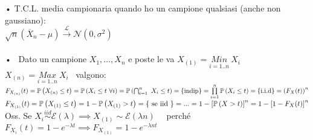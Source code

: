 • T.C.L. media campionaria quando ho un campione qualsiasi (anche non gaussiano):\\
$\sqrt{n}(\overline{X}_n-\mu)\xrightarrow{\mathcal{L}} \mathcal{N}(0,\sigma^2)$ \\ \\







• \ Dato un campione $X_1, ..., X_n$ e poste le va $X_{(1)}=\underset{i=1..n}{Min} \ X_i$ \ \ $X_{(n)}=\underset{i=1..n}{Max} \ X_i$ \ valgono:\\
$F_{X_{(n)}}(t)=\mathbb{P} \left( X_{(n)}\le t \right) = \mathbb{P} \left( X_i \le t \ \forall i \right) = \mathbb{P} \left( \bigcap_{i=1}^n \ X_i\le t \right) = \{ \text{indip} \} = \prod\limits_{i=1}^{n}\mathbb{P} \left( X_i\le t \right)= \{ \text{i.i.d} \} = \left( F_X(t)\right)^n$\\
$F_{X_{(1)}}(t)=\mathbb{P} \left( X_{(1)}\le t \right) = 1 - \mathbb{P} \left( X_{(1)}>t \right)=\{ \text{ se iid } \} = ...= 1- \left[\mathbb{P} \left( X>t \right)\right]^n = 1 - \left[ 1- F_X(t) \right]^n $\\


Oss. Se $X_i\overset{iid}{\sim} \mathcal{E}(\lambda) \implies X_{(1)}\sim\mathcal{E}(\lambda n)$ \ \
perché $F_{X_i}(t)=1-e^{-\lambda t} \implies F_{X_{(1)}}=1-e^{-\lambda nt}$ \\
